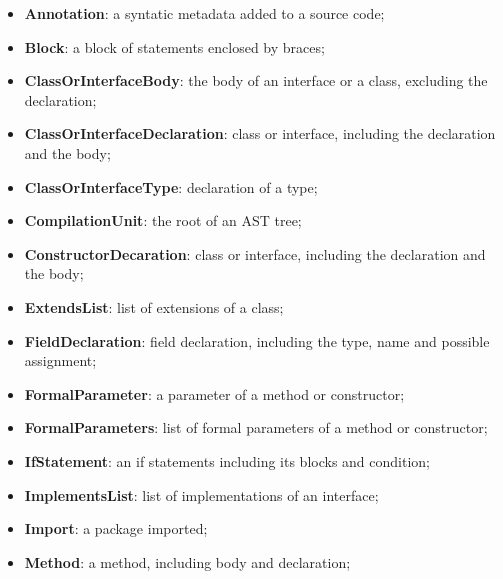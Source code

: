 \documentclass[
]{article}
\begin{document}
%
%

\begin{itemize}

\item \textbf{Annotation}: a syntatic metadata added to a source code;

\item \textbf{Block}: a block of statements enclosed by braces;

\item \textbf{ClassOrInterfaceBody}: the body of an interface or a class, excluding the declaration;

\item \textbf{ClassOrInterfaceDeclaration}: class or interface, including the declaration and the body;

\item \textbf{ClassOrInterfaceType}: declaration of a type;

\item \textbf{CompilationUnit}: the root of an AST tree;

\item \textbf{ConstructorDecaration}: class or interface, including the declaration and the body;

\item \textbf{ExtendsList}: list of extensions of a class;

\item \textbf{FieldDeclaration}: field declaration, including the type, name and possible assignment;

\item \textbf{FormalParameter}: a parameter of a method or constructor;

\item \textbf{FormalParameters}:  list of formal parameters of a method or constructor;

\item \textbf{IfStatement}: an if statements including its blocks and condition;

\item \textbf{ImplementsList}: list of implementations of an interface;

\item \textbf{Import}: a package imported;

\item \textbf{Method}: a method, including body and declaration;


\end{itemize}
\end{document}
